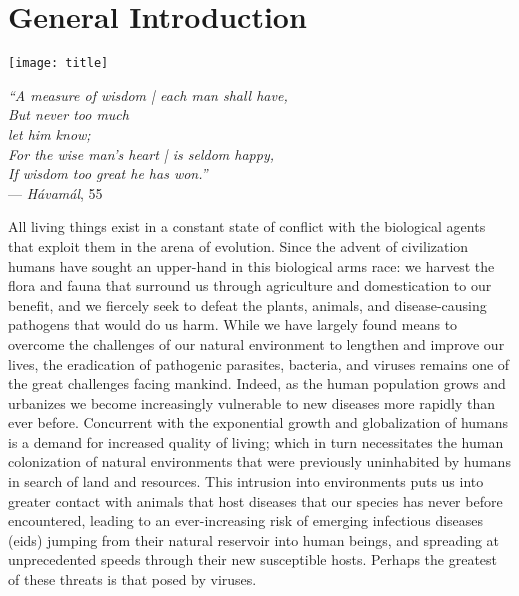 \chapter{General Introduction}\label{ch:introduction}

\begin{minipage}[b]{0.6\textwidth}
  \texttt{[image: title]} %
\end{minipage}
\hfill
\begin{minipage}[b]{0.35\textwidth}
  \begin{flushright}
    \footnotesize
    \textit{``A measure of wisdom | each man shall have,\\
    But never too much\\let him know;\\
    For the wise man's heart | is seldom happy,\\
    If wisdom too great he has won.''} \\
    --- \textit{H\'avam\'al}, 55
  \end{flushright}
  \vspace{2cm}
\end{minipage}

\clearpage

\onehalfspacing

All living things exist in a constant state of conflict with the biological agents that exploit them in the arena of evolution.
Since the advent of civilization humans have sought an upper-hand in this biological arms race: we harvest the flora and fauna that surround us through agriculture and domestication to our benefit, and we fiercely seek to defeat the plants, animals, and disease-causing pathogens that would do us harm.
While we have largely found means to overcome the challenges of our natural environment to lengthen and improve our lives, the eradication of pathogenic parasites, bacteria, and viruses remains one of the great challenges facing mankind.
Indeed, as the human population grows and urbanizes we become increasingly vulnerable to new diseases more rapidly than ever before.
Concurrent with the exponential growth and globalization of humans is a demand for increased quality of living; which in turn necessitates the human colonization of natural environments that were previously uninhabited by humans in search of land and resources.
This intrusion into environments puts us into greater contact with animals that host diseases that our species has never before encountered, leading to an ever-increasing risk of emerging infectious diseases (\gls{eid}s) \citep{Morens2020} jumping from their natural reservoir into human beings, and spreading at unprecedented speeds through their new susceptible hosts.
Perhaps the greatest of these threats is that posed by viruses.

